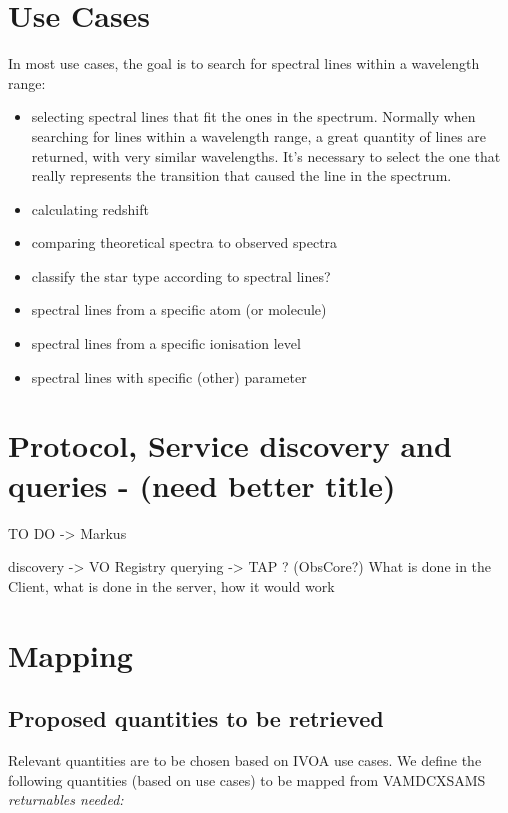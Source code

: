 \documentclass[11pt,a4paper]{ivoa}
\begin{document}
\section{Use Cases}

In most use cases, the goal is to search for spectral lines within a wavelength range:

\begin{itemize}

\item selecting  spectral lines that fit the ones in the spectrum.
Normally when searching for lines within a wavelength range, a great quantity of lines are returned, with very similar wavelengths. It's necessary to select the one that really represents the transition that caused the line in the spectrum.

\item calculating redshift
\item comparing theoretical spectra to observed spectra
\item classify the star type according to spectral lines?
\item spectral lines from a specific atom (or molecule)
\item spectral lines from a specific ionisation level
\item spectral lines with specific (other) parameter

\end{itemize}

\section{Protocol, Service discovery and queries - (need better title)}
TO DO -> Markus

discovery -> VO Registry
querying ->  TAP ? (ObsCore?)
What is done in the Client, what is done in the server, how it would work


\section{Mapping}



\subsection{Proposed quantities to be retrieved}\label{quantities}

Relevant quantities are to be chosen based on IVOA use cases. We define the following quantities (based on use cases) to be mapped from VAMDCXSAMS \textit{returnables needed:}
\end{document}
